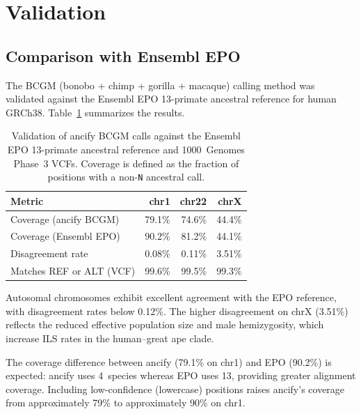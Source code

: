 \documentclass[11pt,a4paper]{article}
\begin{document}
\section{Validation}
\label{sec:validation}

\subsection{Comparison with Ensembl EPO}
\label{sec:epo}

The BCGM (bonobo + chimp + gorilla + macaque) calling method was validated
against the Ensembl EPO 13-primate ancestral reference for human GRCh38.
Table~\ref{tab:validation} summarizes the results.

\begin{table}[t]
\centering
\caption{Validation of ancify BCGM calls against the Ensembl EPO 13-primate
ancestral reference and 1000~Genomes Phase~3 VCFs. Coverage is defined as the
fraction of positions with a non-\texttt{N} ancestral call.}
\label{tab:validation}
\begin{tabular}{@{}lrrr@{}}
\toprule
Metric & chr1 & chr22 & chrX \\
\midrule
Coverage (ancify BCGM) & 79.1\% & 74.6\% & 44.4\% \\
Coverage (Ensembl EPO) & 90.2\% & 81.2\% & 44.1\% \\
Disagreement rate & 0.08\% & 0.11\% & 3.51\% \\
Matches REF or ALT (VCF) & 99.6\% & 99.5\% & 99.3\% \\
\bottomrule
\end{tabular}
\end{table}

Autosomal chromosomes exhibit excellent agreement with the EPO reference,
with disagreement rates below 0.12\%. The higher disagreement on chrX
(3.51\%) reflects the reduced effective population size and male
hemizygosity, which increase ILS rates in the human--great ape clade.

The coverage difference between ancify (79.1\% on chr1) and EPO (90.2\%)
is expected: ancify uses 4~species whereas EPO uses 13, providing greater
alignment coverage. Including low-confidence (lowercase) positions raises
ancify's coverage from approximately 79\% to approximately 90\% on chr1.

\end{document}
